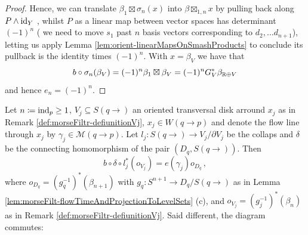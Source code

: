 \begin{proof}
	Hence, we can translate $\beta_1 \boxtimes \sigma_n(x)$ into $\beta \boxtimes_{1,n} x$ by pulling back along $P\wedge \operatorname{\mathrm{id}}_Y$ , whilst $P$ as a linear map between vector spaces has determinant $(-1)^n$ ( we need to move $s_1$ past $n$ basis vectors corresponding to $d_2,\dots d_{n+1}$), letting us apply Lemma \ref{lem:orient-linearMapsOnSmashProducts} to conclude its pullback is the identity times $(-1)^n$. With $x=\beta_V$ we have that
	\begin{equation*}
		b\circ \sigma_n(\beta_V)=(-1)^n\beta_1\boxtimes \beta_V=(-1)^nG_V^*\beta_{\mathbb{R}\oplus V}
	\end{equation*}
	and hence $e_n=(-1)^n$.
\end{proof}
\begin{lemma}\label{lem:morseFiltr-contributionOfASigleFlowLine}
	Let $n\coloneq \mathrm{ind}_p\geq 1$, $V_j\subseteq S(q\to)$ an oriented transversal disk arround $x_j$ as in Remark \ref{def:morseFiltr-defiunitionVj}, $x_j\in W(q\to p)$ and denote the flow line through $x_j$ by $\gamma_j\in \mathcal{M}(q\to p)$. Let $l_j:S(q\to)\to V_j/\partial V_j$ be the collaps and $\delta$ be the connecting homomorphism of the pair $(D_q,S(q\to))$. Then 
	\begin{equation*}
		b\circ \delta\circ l_j^*(o_{V_j})=e(\gamma_j)o_{D_q}\,,
	\end{equation*} where $o_{D_q}=(g_q^{-1})^*(\beta_{n+1})$ with $g_q:S^{n+1}\to D_q/ S(q\to)$ as in Lemma \ref{lem:morseFilt-flowTimeAndProjectionToLevelSets} (c), and $o_{V_j}=(g_j^{-1})^*(\beta_n)$ as in Remark \ref{def:morseFiltr-defiunitionVj}. Said different, the diagram commutes:
	\begin{center}
	\end{center}
\end{lemma}


